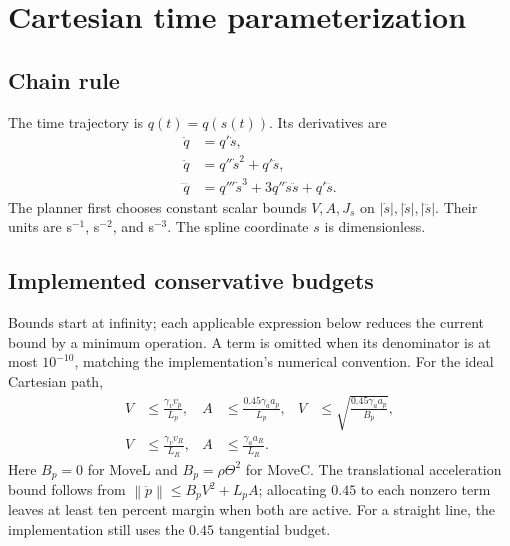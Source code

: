\documentclass[11pt,a4paper]{report}
\newcommand{\norm}[1]{\left\lVert#1\right\rVert}
\begin{document}
\section{Cartesian time parameterization}
\subsection{Chain rule}
The time trajectory is $q(t)=q(s(t))$. Its derivatives are
\begin{align}
 \dot q&=q'\dot s,\\
 \ddot q&=q''\dot s^2+q'\ddot s,\\
 \dddot q&=q'''\dot s^3+3q''\dot s\ddot s+q'\dddot s.
 \label{eq:chainrule}
\end{align}
The planner first chooses constant scalar bounds $V,A,J_s$ on
$|\dot s|,|\ddot s|,|\dddot s|$. Their units are s$^{-1}$, s$^{-2}$,
and s$^{-3}$. The spline coordinate $s$ is dimensionless.

\subsection{Implemented conservative budgets}
Bounds start at infinity; each applicable expression below reduces the
current bound by a minimum operation. A term is omitted when its denominator
is at most $10^{-10}$, matching the implementation's numerical convention.
For the ideal Cartesian path,
\begin{align}
 V&\le\frac{\gamma_vv_p}{L_p},&
 A&\le\frac{0.45\gamma_aa_p}{L_p},&
 V&\le\sqrt{\frac{0.45\gamma_aa_p}{B_p}},\\
 V&\le\frac{\gamma_vv_R}{L_R},&
 A&\le\frac{\gamma_aa_R}{L_R}.&&
\end{align}
Here $B_p=0$ for MoveL and $B_p=\rho\Theta^2$ for MoveC. The translational
acceleration bound follows from
$\norm{\ddot p}\le B_pV^2+L_pA$; allocating $0.45$ to each nonzero term
leaves at least ten percent margin when both are active. For a straight line,
the implementation still uses the $0.45$ tangential budget.
\end{document}
